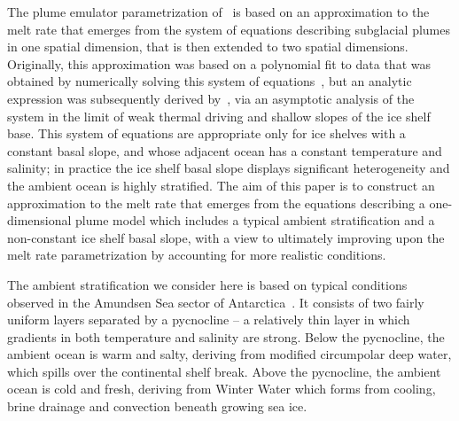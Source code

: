 \documentclass[openacc]{rsproca_new}%
\begin{document}
The plume emulator parametrization of~\citet{Lazeroms2018TheCryo} is based on an approximation to the melt rate that emerges from the system of equations describing subglacial plumes in one spatial dimension, that is then extended to two spatial dimensions. Originally, this approximation was based on a polynomial fit to data that was obtained by numerically solving this system of equations~\citep{Jenkins2014scaling}, but an analytic expression was subsequently derived by~\citet{Lazeroms2019JPhysOcean}, via an asymptotic analysis of the system in the limit of weak thermal driving and shallow slopes of the ice shelf base. This system of equations are appropriate only for ice shelves with a constant basal slope, and whose adjacent ocean has a constant temperature and salinity; in practice the ice shelf basal slope displays significant heterogeneity and the ambient ocean is highly stratified. The aim of this paper is to construct an approximation to the melt rate that emerges from the equations describing a one-dimensional plume model which includes a typical ambient stratification and a non-constant ice shelf basal slope, with a view to ultimately improving upon the~\citet{Lazeroms2018TheCryo} melt rate parametrization by accounting for more realistic conditions.

The ambient stratification we consider here is based on typical conditions observed in the Amundsen Sea sector of Antarctica~\cite{Jenkins2018NatureGeo}. It consists of two fairly uniform layers separated by a pycnocline -- a relatively thin layer in which gradients in both temperature and salinity are strong. Below the pycnocline, the ambient ocean is warm and salty, deriving from modified circumpolar deep water, which spills over the continental shelf break. Above the pycnocline, the ambient ocean is cold and fresh, deriving from Winter Water which forms from cooling, brine drainage and convection beneath growing sea ice.
\end{document}
